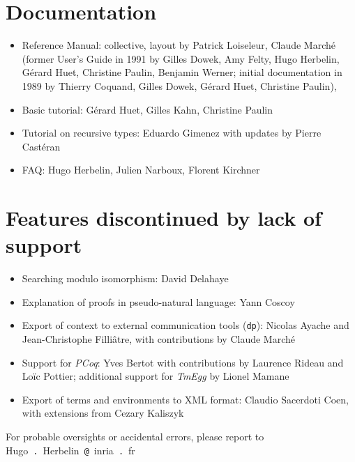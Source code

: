 \documentclass{article}
\begin{document}
\section{Documentation}

\begin{itemize}

\item Reference Manual: collective, layout by Patrick Loiseleur,
  Claude Marché (former User's Guide in 1991 by Gilles Dowek, Amy
  Felty, Hugo Herbelin, Gérard Huet, Christine Paulin, Benjamin
  Werner; initial documentation in 1989 by Thierry Coquand, Gilles
  Dowek, Gérard Huet, Christine Paulin),
\item Basic tutorial: Gérard Huet, Gilles Kahn, Christine Paulin
\item Tutorial on recursive types: Eduardo Gimenez with updates by Pierre Castéran
\item FAQ: Hugo Herbelin, Julien Narboux, Florent Kirchner
\end{itemize}

\section{Features discontinued by lack of support}

\begin{itemize}
\item Searching modulo isomorphism: David Delahaye
\item Explanation of proofs in pseudo-natural language: Yann Coscoy
\item Export of context to external communication tools (\texttt{dp}):
  Nicolas Ayache and Jean-Christophe Filliâtre, with contributions by
  Claude Marché
\item Support for {\em PCoq}: Yves Bertot with contributions by
  Laurence Rideau and Loïc Pottier; additional support for {\em TmEgg}
  by Lionel Mamane
\item Export of terms and environments to XML format: Claudio
  Sacerdoti Coen, with extensions from Cezary Kaliszyk
\end{itemize}

For probable oversights or accidental errors, please report to Hugo~\verb=.=~Herbelin~\verb=@=~inria~\verb=.=~fr
\end{document}
